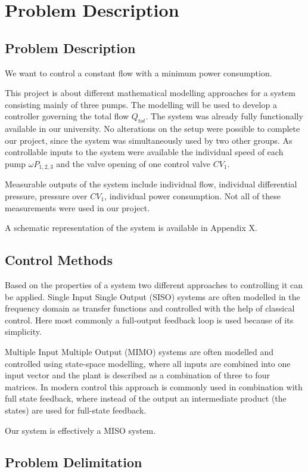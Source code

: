 \chapter{Problem Description}\label{ch:probdesc}

\section{Problem Description}
We want to control a constant flow with a minimum power consumption.

This project is about different mathematical modelling approaches for a system consisting mainly of three pumps.
The modelling will be used to develop a controller governing the total flow $Q_{tot}$.
The system was already fully functionally available in our university.
No alterations on the setup were possible to complete our project,
since the system was simultaneously used by two other groups.
As controllable inputs
to the system were available the individual speed of each pump $\omega P_{1,2,3}$ and the valve opening of one control valve $CV_1$.

Measurable outputs of the system include
individual flow, individual differential pressure, pressure over $CV_1$, individual power consumption.
Not all of these measurements were used in our project.

A schematic representation of the system is available in Appendix X.


\section{Control Methods}
Based on the properties of a system two different approaches to controlling it can be applied.
Single Input Single Output (SISO) systems are often modelled in the frequency domain
as transfer functions and controlled with the help of classical control.
Here most commonly a full-output feedback loop is used because of its simplicity.
\cite{Franklin2014}

Multiple Input Multiple Output (MIMO) systems are often modelled and controlled using state-space
modelling, where all inputs are combined into one input vector
and the plant is described as a combination of three to four matrices.
In modern control this approach is commonly used in combination with full state feedback,
where instead of the output an intermediate product (the states) are used for full-state feedback.

Our system is effectively a MISO system.





\section{Problem Delimitation}
